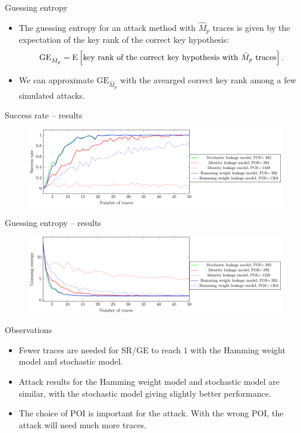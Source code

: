 \begin{frame}{Guessing entropy}
    \begin{itemize}
        \item The guessing entropy for an attack method with $\hat{M}_p$ traces is given by the expectation of the key rank of the correct key hypothesis:
\begin{equation*}
    \text{GE}_{\hat{M}_p}=\textrm{E}\left[\text{key rank of the correct key hypothesis with $\hat{M}_p$ traces}\right].
\end{equation*}
\item We can approximate $\text{GE}_{\hat{M}_p}$ with the avearged correct key rank among a few simulated attacks.
    \end{itemize}
\end{frame}


\begin{frame}{Success rate -- results}
    \begin{figure}[htb]
    \centering
    \includegraphics[width=1\textwidth]{fig/SR_DPA.pdf}
\end{figure}
\end{frame}

\begin{frame}{Guessing entropy -- results}
    \begin{figure}[htb]
    \centering
    \includegraphics[width=1\textwidth]{fig/GE_DPA.pdf}
\end{figure}
\end{frame}

\begin{frame}{Observations}
    \begin{itemize}
        \item Fewer traces are needed for SR/GE to reach $1$ with the Hamming weight model and stochastic model.
        \item Attack results for the Hamming weight model and stochastic model are similar, with the stochastic model giving slightly better performance.
       \item The choice of POI is important for the attack.
       With the wrong POI, the attack will need much more traces.
    \end{itemize}
\end{frame}

